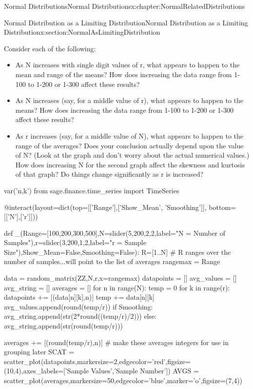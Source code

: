 \documentclass[oneside,10pt,]{book}
\numberwithin{equation}{section}
\begin{document}
\begin{chapterptx}{Normal Distributions}{}{Normal Distributions}{}{}{x:chapter:NormalRelatedDistributions}
\begin{sectionptx}{Normal Distribution as a Limiting Distribution}{}{Normal Distribution as a Limiting Distribution}{}{}{x:section:NormalAsLimitingDistribution}
\par
Consider each of the following:%
\begin{itemize}[label=\textbullet]
\item{}As N increases with single digit values of r, what appears to happen to the mean and range of the means?  How does increasing the data range from 1-100 to 1-200 or 1-300 affect these results?%
\item{}As N increases (say, for a middle value of r), what appears to happen to the means?  How does increasing the data range from 1-100 to 1-200 or 1-300 affect these results?%
\item{}As r increases (say, for a middle value of N), what appears to happen to the range of the averages?  Does your conclusion actually depend upon the value of N?  (Look at the graph and don't worry about the actual numerical values.) How does increasing N for the second graph affect the skewness and kurtosis of that graph?  Do things change significantly as r is increased?%
\end{itemize}
%
\par
\leavevmode%
\begin{sageinput}
var('n,k')
from sage.finance.time_series import TimeSeries

@interact(layout=dict(top=[['Range'],['Show_Mean', 'Smoothing']],  
bottom=[['N'],['r']]))

def _(Range=[100,200,300,500],N=slider(5,200,2,2,label="N = Number of Samples"),r=slider(3,200,1,2,label="r = Sample Size"),Show_Mean=False,Smoothing=False):
    R=[1..N]     #  R ranges over the number of samples...will point to the list of averages
    rangemax = Range

    data = random_matrix(ZZ,N,r,x=rangemax)
    datapoints = []
    avg_values = []
    avg_string = []
    averages = []
    for n in range(N):
        temp = 0
        for k in range(r):
            datapoints += [(data[n][k],n)]
            temp += data[n][k]
        avg_values.append(round(temp/r))
        if Smoothing:
            avg_string.append(str(2*round((temp/r)/2)))    
        else:
            avg_string.append(str(round(temp/r)))
            
        averages += [(round(temp/r),n)]   #  make these averages integers for use in grouping later
    SCAT = scatter_plot(datapoints,markersize=2,edgecolor='red',figsize=(10,4),axes_labels=['Sample Values','Sample Number'])
    AVGS = scatter_plot(averages,markersize=50,edgecolor='blue',marker='o',figsize=(7,4))
    

\end{sageinput}
\end{sectionptx}
\end{chapterptx}
\end{document}
